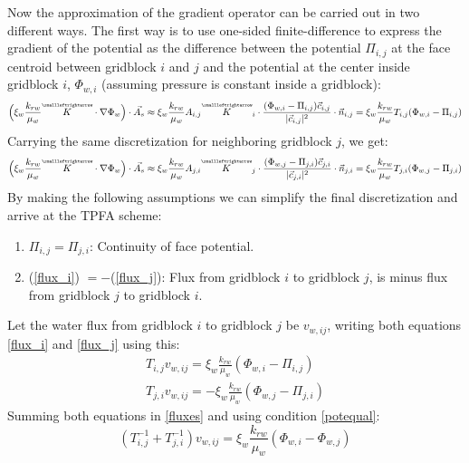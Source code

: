 Now the approximation of the gradient operator can be carried out in two different ways. The first way is to use one-sided finite-difference to express the gradient of the potential as the difference between the potential $\Pi_{i,j}$
at the face centroid between gridblock $i$ and $j$ and the potential at the center inside gridblock $i$, $\Phi_{w,i}$ (assuming pressure is constant inside a gridblock):
\begin{equation}
	\Big(\xi_{w}\frac{k_{rw}}{\mu_{w}}\tensor{K}\cdot \nabla\Phi_{w}\Big)\cdot\vec{A_{s}} \approx \xi_{w}\frac{k_{rw}}{\mu_{w}}A_{i,j}\tensor{K}_{i}\cdot\frac{(\Phi_{w,i}-\Pi_{i,j})\vec{c}_{i,j}}{|\vec{c}_{i,j}|^{2}}\cdot\vec{n}_{i,j} = \xi_{w}\frac{k_{rw}}{\mu_{w}}T_{i,j} (\Phi_{w,i}-\Pi_{i,j})
	\label{flux_i}
\end{equation}
Carrying the same discretization for neighboring gridblock $j$, we get:
\begin{equation}
	\Big(\xi_{w}\frac{k_{rw}}{\mu_{w}}\tensor{K}\cdot \nabla\Phi_{w}\Big)\cdot\vec{A_{s}} \approx \xi_{w}\frac{k_{rw}}{\mu_{w}}A_{j,i}\tensor{K}_{j}\cdot\frac{(\Phi_{w,j}-\Pi_{j,i})\vec{c}_{j,i}}{|\vec{c}_{j,i}|^{2}}\cdot\vec{n}_{j,i} = \xi_{w}\frac{k_{rw}}{\mu_{w}}T_{j,i} (\Phi_{w,j}-\Pi_{j,i})
	\label{flux_j}
\end{equation}
By making the following assumptions we can simplify the final discretization and arrive at the TPFA scheme:
\begin{enumerate}[label=\color{alizarin}\Roman*.]
	\item $\Pi_{i,j} = \Pi_{j,i}$: Continuity of face potential.
	\item\label{potequal} (\ref{flux_i}) $=-$(\ref{flux_j}): Flux from gridblock $i$ to gridblock $j$, is minus flux from gridblock $j$ to gridblock $i$.
\end{enumerate}
Let the water flux from gridblock $i$ to gridblock $j$ be $v_{w, ij}$, writing both equations \ref{flux_i} and \ref{flux_j} using this:
\begin{align}
T_{i,j}v_{w, ij} = \xi_{w}\frac{k_{rw}}{\mu_{w}} (\Phi_{w,i}-\Pi_{i,j})\nonumber \\
T_{j,i}v_{w, ij} = -\xi_{w}\frac{k_{rw}}{\mu_{w}}(\Phi_{w,j}-\Pi_{j,i})
\label{fluxes}
\end{align}
Summing both equations in \ref{fluxes} and using condition \ref{potequal}:
\begin{equation}
(T_{i,j}^{-1}+T_{j,i}^{-1})v_{w, ij} = \xi_{w}\frac{k_{rw}}{\mu_{w}} (\Phi_{w,i}-\Phi_{w,j})
\end{equation}
